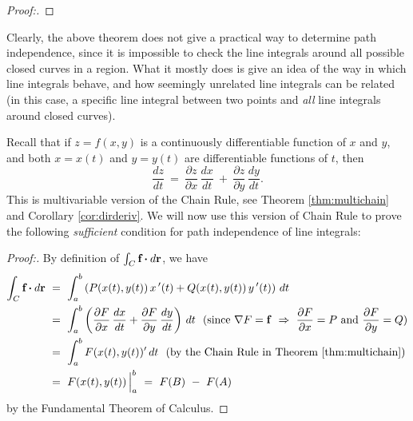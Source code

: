 \begin{proofbar}
\begin{proof}[Proof:]
\end{proof}\end{proofbar}

Clearly, the above theorem does not give a practical way to determine path independence, since it is impossible to
check the line integrals around all possible closed curves in a region.
What it mostly does is give an idea of the
way in which line integrals behave, and how seemingly unrelated line integrals can be related (in this case, a
specific line integral between two points and \emph{all} line integrals around closed curves).

Recall that if $z=f(x,y)$ is a continuously differentiable function of $x$ and $y$, and both $x=x(t)$ and $y=y(t)$ are
 differentiable functions of $t$, then 
 \begin{equation}\label{eqn:chainrule2}
  \frac{dz}{dt} ~=~ \frac{\partial z}{\partial x}\,\frac{dx}{dt} ~+~ \frac{\partial z}{\partial y}\,\frac{dy}{dt}.
 \end{equation}
This is multivariable version of the Chain Rule, see Theorem \ref{thm:multichain} and Corollary \ref{cor:dirderiv}.
We will now use this version of Chain Rule to prove the
following \emph{sufficient} condition for path independence of line integrals:

\begin{proofbar}\begin{proof}[Proof:]
 By definition of $\int_{C} \textbf{f} \bm{\cdot} d\textbf{r}$, we have
 \begin{align*}
  \int_{C} \textbf{f} \bm{\cdot} d\textbf{r} ~&=~ \int_a^b \left( P(x(t),y(t))\,x\,'(t) + Q(x(t),y(t))\,y\,'(t) \right)\,dt\\
   &=~ \int_a^b \left( \frac{\partial F}{\partial x}\,\frac{dx}{dt} + \frac{\partial F}{\partial y}\,\frac{dy}{dt}
   \right)\,dt ~~\text{(since $\nabla F = \mathbf{f} ~\Rightarrow~ \frac{\partial F}{\partial x} = P$ and
   $\frac{\partial F}{\partial y} = Q$)}\\
   &=~ \int_a^b F(x(t),y(t))'\,dt ~~\text{(by the Chain Rule in Theorem \ref{thm:multichain})}\\
   &=~ F(x(t),y(t)) \,\Big|_a^b ~=~ F(B) ~-~ F(A)
 \end{align*}
 by the Fundamental Theorem of Calculus.
 
\end{proof}\end{proofbar}


